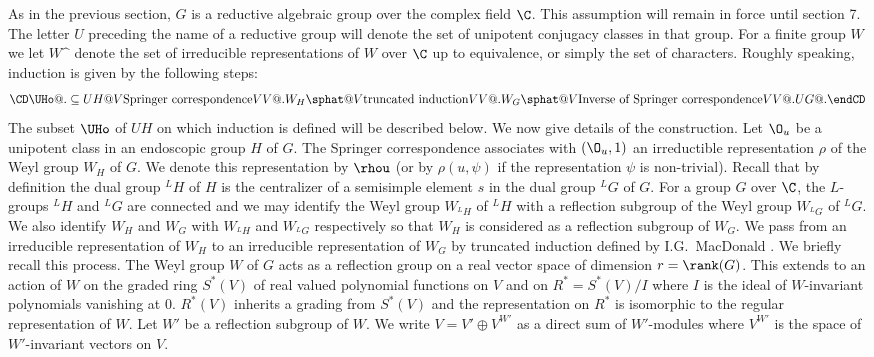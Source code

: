 As in the previous section, $G$ is a reductive algebraic group
over the
complex field $\C$.  This
assumption will remain in force until section 7.  The letter $U$
preceding
the name of a reductive group will denote the set of unipotent
conjugacy
classes in that group.  For a finite group $W$ we let $W\sphat$
denote the
set of irreducible representations of $W$ over $\C$ up to
equivalence, or simply the set of characters.  Roughly speaking,
induction 
is given by the following steps:
     $$
     \CD
     \UHo                                              @.    
\subseteq UH   \\
     @V\text{Springer correspondence}VV                     @.\\
     W_H\sphat                                              \\
     @V\text{truncated induction}VV                         @.\\
     W_G\sphat                                              \\
     @V\text{Inverse of Springer correspondence}VV          @.\\
     UG                                                @.
     \endCD
     $$
The subset $\UHo$ of $UH$ on which induction is defined will be
described
below.  We now give details of the construction.  Let $\O_u$ be a
unipotent
class in an endoscopic group $H$ of $G$.  The Springer
correspondence
associates with $(\O_u,1)$ an irreductible representation $\rho$
of the
Weyl group $W_H$ of $G$.  We denote this representation by
$\rhou$ (or by
$\rho(u,\psi)$ if the representation $\psi$ is non-trivial). 
Recall that by
definition \cite{L} the dual group ${}^LH$ of $H$ is the
centralizer of
a semisimple element $s$ in the dual group ${}^LG$ of $G$.  For a
group $G$
over $\C$, the $L$-groups ${}^LH$ and ${}^LG$ are connected and
we may identify
the Weyl group $W_{{}^LH}$ of ${}^LH$ with a reflection subgroup
of the Weyl 
group
$W_{{}^LG}$ of ${}^LG$.  We also identify $W_H$ and $W_G$ with
$W_{{}^LH}$
and $W_{{}^LG}$ respectively so that $W_H$ is considered as a
reflection subgroup of $W_G$.  We pass from an irreducible
representation of
$W_H$ to an irreducible representation of $W_G$ by truncated
induction 
defined by I.G.~MacDonald \cite{M1}.  We briefly recall this
process.  The
Weyl group $W$ of $G$ acts as a reflection group on a real vector
space of
dimension $r = \rank(G)$.  This extends to an action of $W$ on
the graded ring $S^*(V)$ of real valued polynomial functions on
$V$ and on
$R^* = S^*(V)/I$ where $I$ is the ideal of $W$-invariant
polynomials
vanishing at 0.  $R^*(V)$ inherits a grading from $S^*(V)$ and
the 
representation on $R^*$ is isomorphic to the regular
representation of $W$.
Let $W'$ be a reflection subgroup of $W$.  We write $V = V'
\oplus V^{W'}$
as a direct sum of $W'$-modules where $V^{W'}$ is the space of
$W'$-invariant
vectors on $V$.

